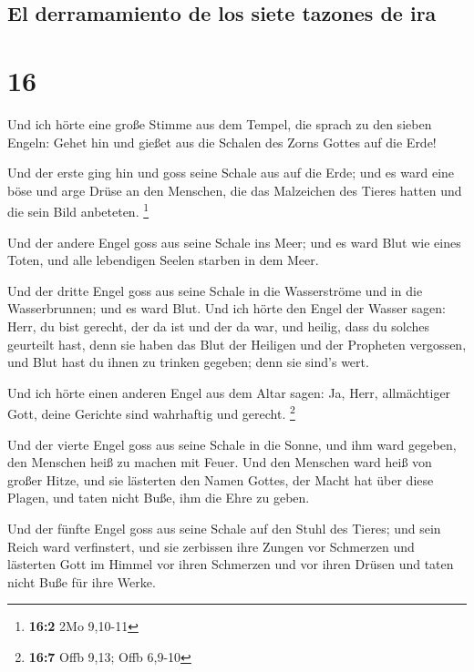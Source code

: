 \hypertarget{el-derramamiento-de-los-siete-tazones-de-ira}{%
\subsection{El derramamiento de los siete tazones de
ira}\label{el-derramamiento-de-los-siete-tazones-de-ira}}

\hypertarget{section-15}{%
\section{16}\label{section-15}}

 Und ich hörte eine große Stimme aus dem Tempel, die
sprach zu den sieben Engeln: Gehet hin und gießet aus die Schalen des
Zorns Gottes auf die Erde!

 Und der erste ging hin und goss seine Schale aus auf die
Erde; und es ward eine böse und arge Drüse an den Menschen, die das
Malzeichen des Tieres hatten und die sein Bild anbeteten. \footnote{\textbf{16:2}
  2Mo 9,10-11}

 Und der andere Engel goss aus seine Schale ins Meer; und
es ward Blut wie eines Toten, und alle lebendigen Seelen starben in dem
Meer.

 Und der dritte Engel goss aus seine Schale in die
Wasserströme und in die Wasserbrunnen; und es ward Blut. 
Und ich hörte den Engel der Wasser sagen: Herr, du bist gerecht, der da
ist und der da war, und heilig, dass du solches geurteilt hast,
 denn sie haben das Blut der Heiligen und der Propheten
vergossen, und Blut hast du ihnen zu trinken gegeben; denn sie sind's
wert.

 Und ich hörte einen anderen Engel aus dem Altar sagen:
Ja, Herr, allmächtiger Gott, deine Gerichte sind wahrhaftig und gerecht.
\footnote{\textbf{16:7} Offb 9,13; Offb 6,9-10}

 Und der vierte Engel goss aus seine Schale in die Sonne,
und ihm ward gegeben, den Menschen heiß zu machen mit Feuer.
 Und den Menschen ward heiß von großer Hitze, und sie
lästerten den Namen Gottes, der Macht hat über diese Plagen, und taten
nicht Buße, ihm die Ehre zu geben.

 Und der fünfte Engel goss aus seine Schale auf den Stuhl
des Tieres; und sein Reich ward verfinstert, und sie zerbissen ihre
Zungen vor Schmerzen  und lästerten Gott im Himmel vor
ihren Schmerzen und vor ihren Drüsen und taten nicht Buße für ihre
Werke.

